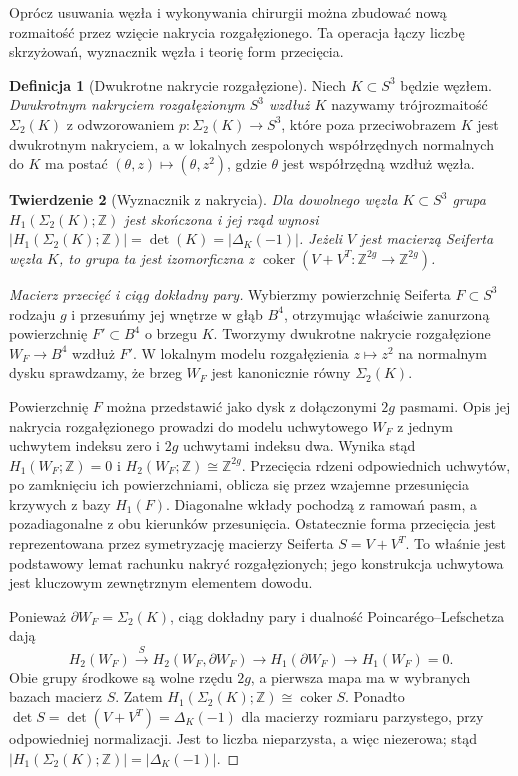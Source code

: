 \documentclass[11pt,a4paper]{report}
\numberwithin{equation}{section}
\theoremstyle{plain}
\newtheorem{twierdzenie}{Twierdzenie}[section]
\theoremstyle{definition}
\newtheorem{definicja}[twierdzenie]{Definicja}
\theoremstyle{remark}
\begin{document}
Oprócz usuwania węzła i wykonywania chirurgii można
zbudować nową rozmaitość przez wzięcie nakrycia
rozgałęzionego. Ta operacja łączy liczbę skrzyżowań,
wyznacznik węzła i teorię form przecięcia.

\begin{definicja}[Dwukrotne nakrycie rozgałęzione]
Niech $K\subset S^3$ będzie węzłem. \emph{Dwukrotnym
nakryciem rozgałęzionym $S^3$ wzdłuż $K$} nazywamy
trójrozmaitość $\Sigma_2(K)$ z odwzorowaniem
$p\colon\Sigma_2(K)\to S^3$, które poza przeciwobrazem
$K$ jest dwukrotnym nakryciem, a w lokalnych zespolonych
współrzędnych normalnych do $K$ ma postać
$(\theta,z)\mapsto(\theta,z^2)$,
gdzie $\theta$ jest współrzędną wzdłuż węzła.
\end{definicja}

\begin{twierdzenie}[Wyznacznik z nakrycia]
Dla dowolnego węzła $K\subset S^3$ grupa
$H_1(\Sigma_2(K);\mathbb Z)$ jest skończona i
jej rząd wynosi
$|H_1(\Sigma_2(K);\mathbb Z)|
=\det(K)=|\Delta_K(-1)|$.
Jeżeli $V$ jest macierzą Seiferta węzła $K$,
to grupa ta jest izomorficzna z
$\operatorname{coker}(V+V^T:\mathbb Z^{2g}\to\mathbb Z^{2g})$.
\end{twierdzenie}

\begin{proof}[Macierz przecięć i ciąg dokładny pary]
Wybierzmy powierzchnię Seiferta $F\subset S^3$ rodzaju $g$
i przesuńmy jej wnętrze w głąb $B^4$, otrzymując właściwie
zanurzoną powierzchnię $F'\subset B^4$ o brzegu $K$.
Tworzymy dwukrotne nakrycie rozgałęzione
$W_F\to B^4$ wzdłuż $F'$. W lokalnym modelu rozgałęzienia
$z\mapsto z^2$ na normalnym dysku sprawdzamy, że brzeg
$W_F$ jest kanonicznie równy $\Sigma_2(K)$.

Powierzchnię $F$ można przedstawić jako dysk z dołączonymi
$2g$ pasmami. Opis jej nakrycia rozgałęzionego prowadzi do
modelu uchwytowego $W_F$ z jednym uchwytem indeksu zero
i $2g$ uchwytami indeksu dwa. Wynika stąd
$H_1(W_F;\mathbb Z)=0$ i $H_2(W_F;\mathbb Z)\cong\mathbb Z^{2g}$.
Przecięcia rdzeni odpowiednich uchwytów, po zamknięciu ich
powierzchniami, oblicza się przez wzajemne przesunięcia
krzywych z bazy $H_1(F)$. Diagonalne wkłady pochodzą z
ramowań pasm, a pozadiagonalne z obu kierunków przesunięcia.
Ostatecznie forma przecięcia jest reprezentowana przez
symetryzację macierzy Seiferta $S=V+V^T$.
To właśnie jest podstawowy lemat rachunku nakryć
rozgałęzionych; jego konstrukcja uchwytowa jest kluczowym
zewnętrznym elementem dowodu.

Ponieważ $\partial W_F=\Sigma_2(K)$, ciąg dokładny pary
i dualność Poincarégo--Lefschetza dają
\[
H_2(W_F)\xrightarrow{\;S\;}H_2(W_F,\partial W_F)
\longrightarrow H_1(\partial W_F)\longrightarrow H_1(W_F)=0.
\]
Obie grupy środkowe są wolne rzędu $2g$, a pierwsza mapa
ma w wybranych bazach macierz $S$. Zatem
$H_1(\Sigma_2(K);\mathbb Z)\cong\operatorname{coker}S$.
Ponadto $\det S=\det(V+V^T)=\Delta_K(-1)$ dla macierzy
rozmiaru parzystego, przy odpowiedniej normalizacji.
Jest to liczba nieparzysta, a więc niezerowa; stąd
$|H_1(\Sigma_2(K);\mathbb Z)|=|\Delta_K(-1)|$.
\end{proof}
\end{document}
